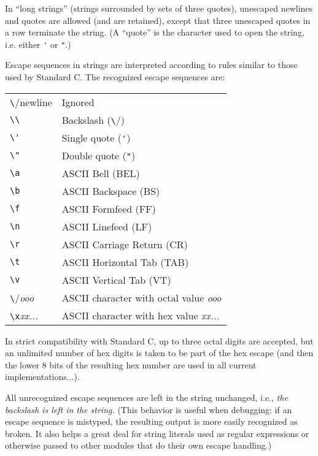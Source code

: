 In ``long strings'' (strings surrounded by sets of three quotes),
unescaped newlines and quotes are allowed (and are retained), except
that three unescaped quotes in a row terminate the string.  (A
``quote'' is the character used to open the string, i.e. either
\verb/'/ or \verb/"/.)

Escape sequences in strings are interpreted according to rules similar
to those used by Standard C.  The recognized escape sequences are:

\begin{center}
\begin{tabular}{|l|l|}
\hline
\verb/\/{newline}	& Ignored \\
\verb/\\/	& Backslash (\verb/\/) \\
\verb/\'/	& Single quote (\verb/'/) \\
\verb/\"/	& Double quote (\verb/"/) \\
\verb/\a/	& ASCII Bell (BEL) \\
\verb/\b/	& ASCII Backspace (BS) \\
\verb/\f/	& ASCII Formfeed (FF) \\
\verb/\n/	& ASCII Linefeed (LF) \\
\verb/\r/	& ASCII Carriage Return (CR) \\
\verb/\t/	& ASCII Horizontal Tab (TAB) \\
\verb/\v/	& ASCII Vertical Tab (VT) \\
\verb/\/{\em ooo}	& ASCII character with octal value {\em ooo} \\
\verb/\x/{\em xx...}	& ASCII character with hex value {\em xx...} \\
\hline
\end{tabular}
\end{center}

In strict compatibility with Standard C, up to three octal digits are
accepted, but an unlimited number of hex digits is taken to be part of
the hex escape (and then the lower 8 bits of the resulting hex number
are used in all current implementations...).

All unrecognized escape sequences are left in the string unchanged,
i.e., {\em the backslash is left in the string.}  (This behavior is
useful when debugging: if an escape sequence is mistyped, the
resulting output is more easily recognized as broken.  It also helps a
great deal for string literals used as regular expressions or
otherwise passed to other modules that do their own escape handling.)

